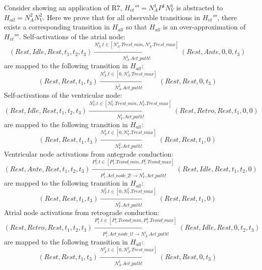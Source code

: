 Consider  showing an application of R7, $H_{vt}'''=N^1_AP^1N^1_V$ is abstracted to $H_{all}=N^2_AN^2_V$. Here we prove that for all observable transitions in $H_{vt}'''$, there exists a corresponding transition in $H_{all}$ so that $H_{all}$ is an over-approximation of $H_{vt}'''$. 
%
Self-activations of the atrial node:
$$(Rest,Idle,Rest,t_1,t_2,t_3)\xrightarrow[N^1_A.Act\_path!]{N^1_A.t\in [N^1_A.Trest\_min, N^1_A.Trest\_max] }(Rest,Ante,0,0,t_3)$$
are mapped to the following transition in $H_{all}$:
$$(Rest,Rest,t_1,t_3)\xrightarrow[N^2_A.Act\_path!]{N^2_A.t\in [0, N^1_A.Trest\_max]}(Rest,Rest,0,t_3)$$
Self-activations of the ventricular node:
$$(Rest,Idle,Rest,t_1,t_2,t_3)\xrightarrow[N^1_V.Act\_path!]{N^1_V.t\in [N^1_V.Trest\_min, N^1_V.Trest\_max] }(Rest,Retro,Rest,t_1,0,0)$$
are mapped to the following transition in $H_{all}$:
$$(Rest,Rest,t_1,t_3)\xrightarrow[N^2_V.Act\_path!]{N^2_V.t\in [0, N^1_V.Trest\_max]}(Rest,Rest,t_1,0)$$
Ventricular node activations from antegrade conduction:
$$(Rest,Ante,Rest,t_1,t_2,t_3)\xrightarrow[P^1_1.Act\_node\_2!\rightarrow N^1_V.Act\_path!]{P^1_1.t\in [P^1_1.Tcond\_min, P^1_1.Tcond\_max] }(Rest,Idle,Rest,t_1,t_2,0)$$
are mapped to the following transition in $H_{all}$:
$$(Rest,Rest,t_1,t_3)\xrightarrow[N^2_V.Act\_path!]{N^2_V.t\in [0, N^2_V.Trest\_max]}(Rest,Rest,t_1,0)$$
Atrial node activations from retrograde conduction:
$$(Rest,Retro,Rest,t_1,t_2,t_3)\xrightarrow[P^1_1.Act\_node\_1!\rightarrow N^1_A.Act\_path!]{P^1_1.t\in [P^1_1.Tcond\_min, P^1_1.Tcond\_max] }(Rest,Idle,Rest,0,t_2,t_3)$$
are mapped to the following transition in $H_{all}$:
$$(Rest,Rest,t_1,t_3)\xrightarrow[N^2_A.Act\_path!]{N^2_A.t\in [0, N^2_A.Trest\_max]}(Rest,Rest,0,t_3)$$


%




